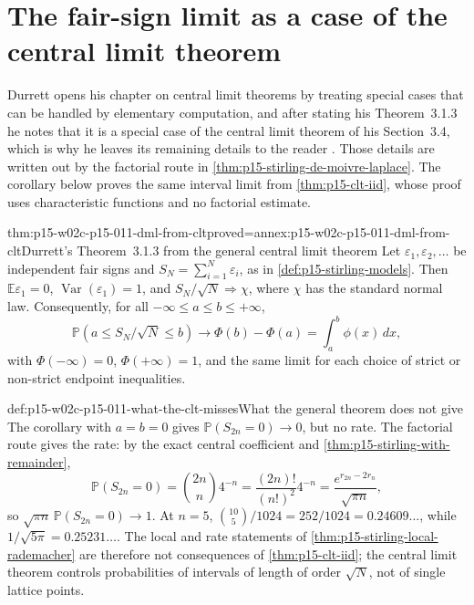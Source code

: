 \section{The fair-sign limit as a case of the central limit theorem}
\label{sec:p15-w02c-p15-011-dml-from-clt}

Durrett opens his chapter on central limit theorems by treating special cases
that can be handled by elementary computation, and after stating his
Theorem~3.1.3 he notes that it is a special case of the central limit theorem
of his Section~3.4, which is why he leaves its remaining details to the
reader \cite[pp.~113, 115]{DurrettPTEAuthor2019}. Those details are written
out by the factorial route in \cref{thm:p15-stirling-de-moivre-laplace}. The
corollary below proves the same interval limit from \cref{thm:p15-clt-iid},
whose proof uses characteristic functions and no factorial estimate.

\begin{hbcorollary}{thm:p15-w02c-p15-011-dml-from-clt}{proved=annex:p15-w02c-p15-011-dml-from-clt}{Durrett's Theorem~3.1.3 from the general central limit theorem}
Let \(\varepsilon_1,\varepsilon_2,\ldots\) be independent fair signs and
\(S_N=\sum_{i=1}^N\varepsilon_i\), as in \cref{def:p15-stirling-models}.
Then \(\mathbb E\varepsilon_1=0\), \(\operatorname{Var}(\varepsilon_1)=1\),
and \(S_N/\sqrt N\Rightarrow\chi\), where \(\chi\) has the standard normal
law. Consequently, for all \(-\infty\leq a\leq b\leq+\infty\),
\[
 \mathbb P(a\leq S_N/\sqrt N\leq b)\longrightarrow\Phi(b)-\Phi(a)
 =\int_a^b\phi(x)\,dx,
\]
with \(\Phi(-\infty)=0\), \(\Phi(+\infty)=1\), and the same limit for each
choice of strict or non-strict endpoint inequalities.
\end{hbcorollary}

\begin{hbexample}{def:p15-w02c-p15-011-what-the-clt-misses}{What the general theorem does not give}
The corollary with \(a=b=0\) gives \(\mathbb P(S_{2n}=0)\to0\), but no rate.
The factorial route gives the rate: by the exact central coefficient and
\cref{thm:p15-stirling-with-remainder},
\[
 \mathbb P(S_{2n}=0)=\binom{2n}n4^{-n}
  =\frac{(2n)!}{(n!)^2}4^{-n}
  =\frac{e^{r_{2n}-2r_n}}{\sqrt{\pi n}},
\]
so \(\sqrt{\pi n}\,\mathbb P(S_{2n}=0)\to1\). At \(n=5\),
\(\binom{10}5/1024=252/1024=0.24609\ldots\), while
\(1/\sqrt{5\pi}=0.25231\ldots\). The local and rate statements of
\cref{thm:p15-stirling-local-rademacher} are therefore not consequences of
\cref{thm:p15-clt-iid}; the central limit theorem controls probabilities of
intervals of length of order \(\sqrt N\), not of single lattice points.
\end{hbexample}

